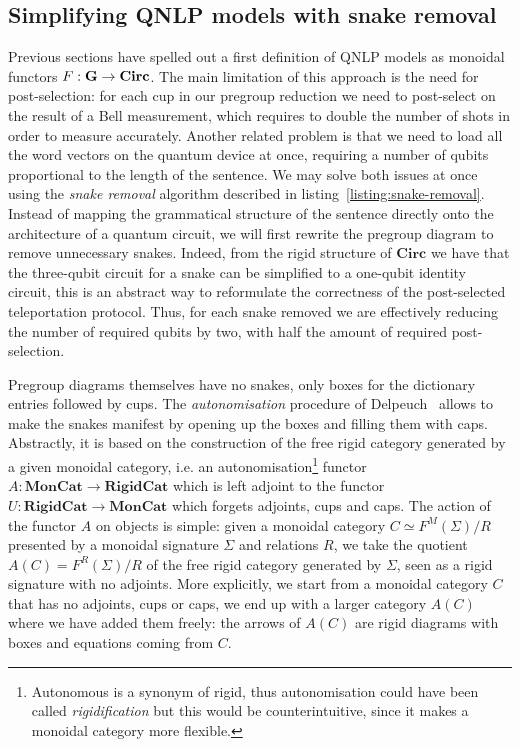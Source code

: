 
\subsection{Simplifying QNLP models with snake removal}\label{subsection:snake-removal}

Previous sections have spelled out a first definition of QNLP models as monoidal functors $F : \mathbf{G} \to \mathbf{Circ}$.
The main limitation of this approach is the need for post-selection: for each cup in our pregroup reduction we need to post-select on the result of a Bell measurement, which requires to double the number of shots in order to measure accurately.
Another related problem is that we need to load all the word vectors on the quantum device at once, requiring a number of qubits proportional to the length of the sentence.
We may solve both issues at once using the \emph{snake removal} algorithm described in listing~\ref{listing:snake-removal}.
Instead of mapping the grammatical structure of the sentence directly onto the architecture of a quantum circuit, we will first rewrite the pregroup diagram to remove unnecessary snakes.
Indeed, from the rigid structure of $\mathbf{Circ}$ we have that the three-qubit circuit for a snake can be simplified to a one-qubit identity circuit, this is an abstract way to reformulate the correctness of the post-selected teleportation protocol.
Thus, for each snake removed we are effectively reducing the number of required qubits by two, with half the amount of required post-selection.

Pregroup diagrams themselves have no snakes, only boxes for the dictionary entries followed by cups.
The \emph{autonomisation} procedure of Delpeuch~\cite{Delpeuch19} allows to make the snakes manifest by opening up the boxes and filling them with caps.
Abstractly, it is based on the construction of the free rigid category generated by a given monoidal category, i.e. an autonomisation\footnote
{Autonomous is a synonym of rigid, thus autonomisation could have been called \emph{rigidification} but this would be counterintuitive, since it makes a monoidal category more flexible.}
functor $A : \mathbf{MonCat} \to \mathbf{RigidCat}$ which is left adjoint to the functor $U : \mathbf{RigidCat} \to \mathbf{MonCat}$ which forgets adjoints, cups and caps.
The action of the functor $A$ on objects is simple: given a monoidal category $C \simeq F^M(\Sigma) / R$ presented by a monoidal signature $\Sigma$ and relations $R$, we take the quotient $A(C) = F^R(\Sigma) / R$ of the free rigid category generated by $\Sigma$, seen as a rigid signature with no adjoints.
More explicitly, we start from a monoidal category $C$ that has no adjoints, cups or caps, we end up with a larger category $A(C)$ where we have added them freely: the arrows of $A(C)$ are rigid diagrams with boxes and equations coming from $C$.

